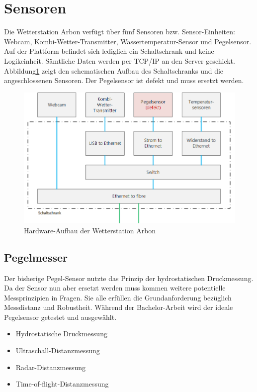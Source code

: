 \section{Sensoren}
Die Wetterstation Arbon verfügt über fünf Sensoren bzw. Sensor-Einheiten: Webcam, Kombi-Wetter-Transmitter, Wassertemperatur-Sensor und Pegelsensor. Auf der Plattform befindet sich lediglich ein Schaltschrank und keine Logikeinheit. Sämtliche Daten werden per TCP/IP an den Server geschickt. Abbildung\ref{img:schaltschrank}  zeigt den schematischen Aufbau des Schaltschranks und die angeschlossenen Sensoren. Der Pegelsensor ist defekt und muss ersetzt werden. 

\begin{figure}[h]
	\centering
	\includegraphics[width=1\linewidth]{img/schaltschrank}
	\caption{Hardware-Aufbau der Wetterstation Arbon}
	\label{img:schaltschrank}
\end{figure}



\subsection{Pegelmesser}
Der bisherige Pegel-Sensor nutzte das Prinzip der hydrostatischen Druckmessung. Da der Sensor nun aber ersetzt werden muss kommen weitere potentielle Messprinzipien in Fragen. Sie alle erfüllen die Grundanforderung bezüglich Messdistanz und Robustheit. Während der Bachelor-Arbeit wird der  ideale Pegelsensor getestet und ausgewählt.

\begin{itemize}  
\item Hydrostatische Druckmessung
\item Ultraschall-Distanzmessung
\item Radar-Distanzmessung
\item Time-of-flight-Distanzmessung
\end{itemize}

